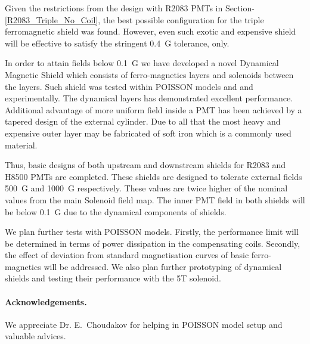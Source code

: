 \documentclass[12pt]{article}
\begin{document}
Given the restrictions from the  design with R2083 PMTs in Section-\ref{R2083_Triple_No_Coil}, 
the best possible configuration for the triple ferromagnetic  shield was found. 
However, even such exotic  and expensive shield 
will  be effective  to satisfy the stringent 0.4~G tolerance, only.

In order to  attain fields below 0.1~G we have developed a novel 
Dynamical Magnetic Shield which consists  of ferro-magnetics layers 
and  solenoids  between the layers. 
Such shield was tested within  POISSON models and  
and experimentally.  The dynamical layers  has demonstrated  excellent  performance.   
Additional advantage of more uniform field inside a PMT has been achieved by
a tapered design of the external cylinder. 
Due to  all that  the most heavy and expensive outer layer may be fabricated of soft 
iron which is a commonly used material. 

Thus, basic designs of both upstream and downstream   shields for R2083 and
H8500 PMTs are completed. These shields are designed to tolerate 
external fields 500~G and 1000~G respectively.  These values  are twice higher of the nominal values
from the main Solenoid field map. The inner PMT field in both shields will be below 0.1~G due to 
the dynamical components of shields.
 
We plan further tests with  POISSON models. Firstly, 
the performance limit will be determined in terms of power dissipation in the compensating coils.  
Secondly, the effect of deviation from standard magnetisation curves of basic ferro-magnetics  will be addressed. 
We also plan further prototyping of  dynamical shields  and testing their performance with the 5T solenoid.

\paragraph{Acknowledgements.}We appreciate Dr. E.~Choudakov for helping in   
POISSON model setup  and valuable advices. 
\end{document}
